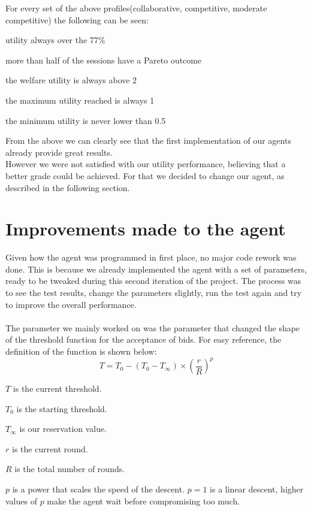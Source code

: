 \documentclass[a4,11pt]{scrartcl}
\let\tempone\itemize
\let\temptwo\enditemize
\renewenvironment{itemize}{\tempone\addtolength{\itemsep}{-0.5\baselineskip}}{\temptwo}
\begin{document}
For every set of the above profiles(collaborative, competitive, moderate competitive) the following can be seen:
  \begin{itemize} 
  \item utility always over the 77\%
  \item more than half of the sessions have a Pareto outcome
  \item the welfare utility is always above 2
  \item the maximum utility reached is always 1
  \item the minimum utility is never lower than 0.5
  \end{itemize}

From the above we can clearly see that the first implementation of our agents already provide great results. 
\\
However we were not satisfied with our utility performance, believing that a better grade could be achieved. For that we decided to change our agent, as described in the following section.  
\label{sec:testresults}



\section{Improvements made to the agent}
Given how the agent was programmed in first place, no major code rework was done. This is because we already implemented the agent with a set of parameters, ready to be tweaked during this second iteration of the project. The process was to see the test results, change the parameters slightly, run the test again and try to improve the overall performance.
\\ \\
The parameter we mainly worked on was the parameter that changed the shape of the threshold function for the acceptance of bids. For easy reference, the definition of the function is shown below:
\\
\begin{equation}
    T=T_{0}-(T_{0}-T_{\infty})\times\left(\frac{r}{R}\right)^{p}
\end{equation}
\begin{itemize}
    \item $T$ is the current threshold.
    \item $T_{0}$ is the starting threshold.
    \item $T_{\infty}$ is our reservation value.
    \item $r$ is the current round.
    \item $R$ is the total number of rounds.
    \item $p$ is a power that scales the speed of the descent. $p=1$ is
    a linear descent, higher values of $p$ make the agent wait before
    compromising too much.
\end{itemize}
\end{document}
